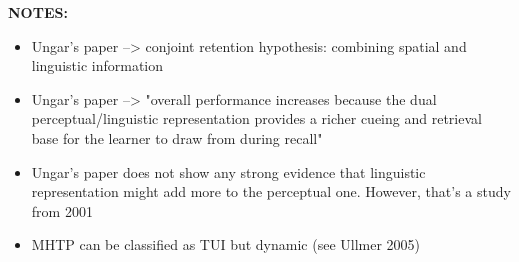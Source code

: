 \textbf{NOTES:}

\begin{itemize}
    \item Ungar's paper --> conjoint retention hypothesis: combining spatial and linguistic information
    \item Ungar's paper --> "overall performance increases because the dual perceptual/linguistic representation provides a richer cueing and retrieval base for the learner to draw from during recall"
    \item Ungar's paper does not show any strong evidence that linguistic representation might add more to the perceptual one. However, that's a study from 2001
    \item MHTP can be classified as TUI but dynamic (see Ullmer 2005)
\end{itemize}

